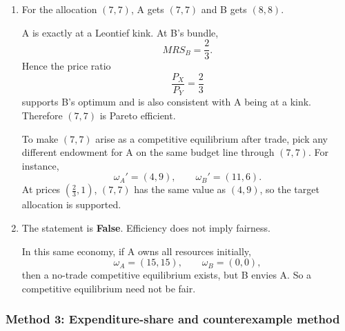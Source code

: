 \documentclass[12pt]{article}
\begin{document}
\begin{enumerate}[label=(\alph*)]
    \item
    For the allocation \((7,7)\), A gets \((7,7)\) and B gets \((8,8)\).

    A is exactly at a Leontief kink. At B's bundle,
    \[
    MRS_B=\frac23.
    \]
    Hence the price ratio
    \[
    \frac{P_X}{P_Y}=\frac23
    \]
    supports B's optimum and is also consistent with A being at a kink. Therefore \((7,7)\) is Pareto efficient.

    To make \((7,7)\) arise as a competitive equilibrium after trade, pick any different endowment for A on the same budget line through \((7,7)\). For instance,
    \[
    \omega_A'=(4,9),
    \qquad
    \omega_B'=(11,6).
    \]
    At prices \(\left(\frac23,1\right)\), \((7,7)\) has the same value as \((4,9)\), so the target allocation is supported.

    \item
    The statement is \textbf{False}. Efficiency does not imply fairness.

    In this same economy, if A owns all resources initially,
    \[
    \omega_A=(15,15),\qquad \omega_B=(0,0),
    \]
    then a no-trade competitive equilibrium exists, but B envies A. So a competitive equilibrium need not be fair.
\end{enumerate}

\newpage
\subsubsection{Method 3: Expenditure-share and counterexample method}
\end{document}
